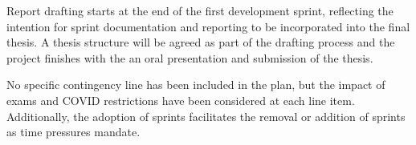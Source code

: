 \documentclass[11pt, parskip=half*,twoside=false]{scrbook}
\begin{document}
{Report drafting starts at the end of the first development sprint, reflecting the intention for sprint documentation and reporting to be incorporated into the final thesis. A thesis structure will be agreed as part of the drafting process and the project finishes with the an oral presentation and submission of the thesis.

No specific contingency line has been included in the plan, but the impact of exams and COVID restrictions have been considered at each line item. Additionally, the adoption of sprints facilitates the removal or addition of sprints as time pressures mandate. 

\begin{landscape}	
	\begin{figure}


\end{figure}
\end{landscape}}
\end{document}
